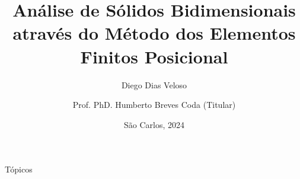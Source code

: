 \documentclass{beamer}
\begin{document}
\title{Análise de Sólidos Bidimensionais através do Método dos Elementos Finitos Posicional}
\author{Diego Dias Veloso \\
\and Prof. PhD. Humberto Breves Coda (Titular)}
\date{São Carlos, 2024}

\begin{frame}
    \titlepage
\end{frame}

\begin{frame}{Tópicos}
    \tableofcontents
\end{frame}




    




\end{document}
